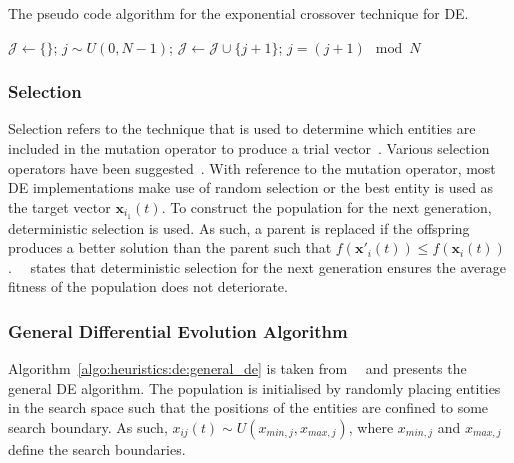 \begin{algorithm}[H]
      \caption{The pseudo code algorithm for the exponential crossover technique for \acs{DE}.}
      \label{algo:heuristics:de:exp}
      \begin{algorithmic}
            \State $\mathcal{J} \gets \{\}$;
            \State $j \sim U(0,N - 1)$;
            \Repeat
            \State $\mathcal{J} \gets \mathcal{J} \cup \{j + 1 \}$;
            \State $j = (j+1) \mod N$
      \end{algorithmic}
\end{algorithm}

\subsubsection{Selection}\label{sec:heuristics:mh:de:selection}

Selection refers to the technique that is used to determine which entities are included in the mutation operator to produce a trial vector~\cite{ref:engelbrecht:2007}. Various selection operators have been suggested~\cite{ref:storn:1996, ref:storn:1997}. With reference to the mutation operator, most \acs{DE} implementations make use of random selection or the best entity is used as the target vector $\boldsymbol{x}_{i_{1}}(t)$. To construct the population for the next generation, deterministic selection is used. As such, a parent is replaced if the offspring produces a better solution than the parent such that $f(\boldsymbol{x}'_{i}(t)) \leq f(\boldsymbol{x}_{i}(t))$.~\citeauthor{ref:engelbrecht:2007}~\cite{ref:engelbrecht:2007} states that deterministic selection for the next generation ensures the average fitness of the population does not deteriorate.


\subsubsection{General Differential Evolution Algorithm}

Algorithm~\ref{algo:heuristics:de:general_de} is taken from~\citeauthor{ref:engelbrecht:2007}~\cite{ref:engelbrecht:2007} and presents the general \acs{DE} algorithm. The population is initialised by randomly placing entities in the search space such that the positions of the entities are confined to some search boundary. As such, $x_{ij}(t) \sim U(x_{min,j}, x_{max,j})$, where $x_{min,j}$ and $x_{max,j}$ define the search boundaries.

